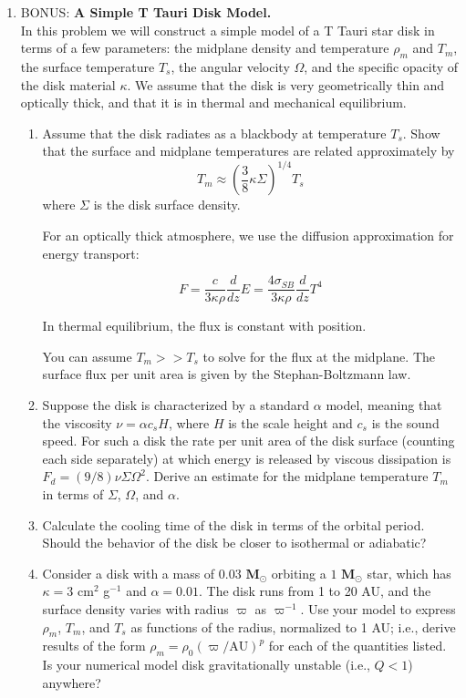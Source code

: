\documentclass[twoside]{tufte-book} %
\newcommand{\msun}{\ensuremath{\textbf{M}_\odot}}
\begin{document}
\begin{enumerate}
\item BONUS: {\bf A Simple T Tauri Disk Model.}\\
In this problem we will construct a simple model of a T Tauri star disk in terms of a few parameters: the midplane density and temperature $\rho_m$ and $T_m$, the surface temperature $T_s$, the angular velocity $\Omega$, and the specific opacity of the disk material $\kappa$. We assume that the disk is very geometrically thin and optically thick, and that it is in thermal and mechanical equilibrium.
\begin{enumerate}
    \item

Assume that the disk radiates as a blackbody at temperature $T_s$. Show that the surface and midplane temperatures are related approximately by
$$
T_m \approx \left(\frac{3}{8}\kappa\Sigma\right)^{1/4} T_s
$$
where $\Sigma$ is the disk surface density.

For an optically thick atmosphere, we use the diffusion approximation for energy transport:

$$F = \frac{c}{3 \kappa \rho} \frac{d}{dz}{E} = \frac{4 \sigma_{SB}}{3\kappa \rho} \frac{d}{dz}T^4$$

In thermal equilibrium, the flux is constant with position.  

You can assume $T_m >> T_s$ to solve for the flux at the midplane.  The surface flux per unit area is given by the Stephan-Boltzmann law.

\item Suppose the disk is characterized by a standard $\alpha$ model, meaning that the viscosity $\nu=\alpha c_s H$, where $H$ is the scale height and $c_s$ is the sound speed. For such a disk the rate per unit area of the disk surface (counting each side separately) at which energy is released by viscous dissipation is $F_d=(9/8) \nu \Sigma \Omega^2$. Derive an estimate for the midplane temperature $T_m$ in terms of $\Sigma$, $\Omega$, and $\alpha$.
\item Calculate the cooling time of the disk in terms of the orbital period. Should the behavior of the disk be closer to isothermal or adiabatic?
\item Consider a disk with a mass of $0.03$ $\msun$ orbiting a $1$ $\msun$ star, which has $\kappa=3$ cm$^2$ g$^{-1}$ and $\alpha=0.01$. The disk runs from 1 to 20 AU, and the surface density varies with radius $\varpi$ as $\varpi^{-1}$. Use your model to express $\rho_m$, $T_m$, and $T_s$ as functions of the radius, normalized to 1 AU; i.e., derive results of the form $\rho_m = \rho_0 (\varpi/\mathrm{AU})^p$ for each of the quantities listed. Is your numerical model disk gravitationally unstable (i.e., $Q<1$) anywhere?
\end{enumerate}



\end{enumerate}
\end{document}

